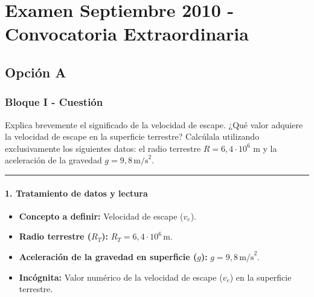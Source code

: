 \chapter{Examen Septiembre 2010 - Convocatoria Extraordinaria}
\label{chap:2010_sep_ext}

\section{Opción A}
\label{sec:A_2010_sep_ext}

\subsection{Bloque I - Cuestión}
\label{subsec:A1_2010_sep_ext}

\begin{cajaenunciado}
Explica brevemente el significado de la velocidad de escape. ¿Qué valor adquiere la velocidad de escape en la superficie terrestre? Calcúlala utilizando exclusivamente los siguientes datos: el radio terrestre $R=6,4\cdot10^{6}$ m y la aceleración de la gravedad $g=9,8\,\text{m/s}^2$.
\end{cajaenunciado}
\hrule

\subsubsection*{1. Tratamiento de datos y lectura}
\begin{itemize}
    \item \textbf{Concepto a definir:} Velocidad de escape ($v_e$).
    \item \textbf{Radio terrestre ($R_T$):} $R_T = 6,4 \cdot 10^6 \, \text{m}$.
    \item \textbf{Aceleración de la gravedad en superficie ($g$):} $g = 9,8 \, \text{m/s}^2$.
    \item \textbf{Incógnita:} Valor numérico de la velocidad de escape ($v_e$) en la superficie terrestre.
\end{itemize}

